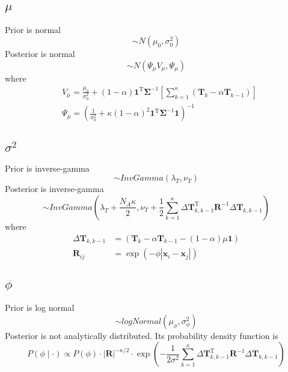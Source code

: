 \documentclass[12pt, letterpaper]{article}
\begin{document}
\subsection{$\mu$}
Prior is normal
\begin{equation}
	\sim N\left(\mu_{0}, \sigma_{0}^{2}\right)
\end{equation}
Posterior is normal
\begin{equation}
	\sim N\left(\Psi_{\mu} V_{\mu}, \Psi_{\mu}\right)
\end{equation}
where
\begin{align}
&V_{\mu}=\frac{\mu_{0}}{\sigma_{0}^{2}}+(1-\alpha) \mathbf{1}^{\mathrm{T}} \mathbf{\Sigma}^{-1}\left[\sum_{k=1}^{\kappa}\left(\mathbf{T}_{k}-\alpha \mathbf{T}_{k-1}\right)\right] \\
&\Psi_{\mu}=\left(\frac{1}{\sigma_{0}^{2}}+\kappa(1-\alpha)^{2} \mathbf{1}^{\mathrm{T}} \mathbf{\Sigma}^{-1} \mathbf{1}\right)^{-1}
\end{align}

\subsection{$\sigma^2$}
Prior is inverse-gamma
\begin{equation}
	\sim InvGamma \left(\lambda_{T}, \nu_{T}\right)
\end{equation}
Posterior is inverse-gamma
\begin{equation}
\sim InvGamma\left(\lambda_{T}+\frac{N_{A} \kappa}{2},
\nu_{T}+\frac{1}{2} \sum_{k=1}^{\kappa} \Delta \mathbf{T}_{k, k-1}^{\mathrm{T}} \mathbf{R}^{-1} \Delta \mathbf{T}_{k, k-1}\right)
\end{equation}
where
\begin{align}
\Delta \mathbf{T}_{k, k-1}&=\left(\mathbf{T}_{k}-\alpha \mathbf{T}_{k-1}-(1-\alpha) \mu \mathbf{1}\right)\\
\mathbf{R}_{i j}&=\exp \left(-\phi\left|\mathbf{x}_{i}-\mathbf{x}_{j}\right|\right)
\end{align}

\subsection{$\phi$}
Prior is log normal
\begin{equation}
	\sim logNormal\left(\mu_{\phi}, \sigma_{\phi}^{2}\right)
\end{equation}
Posterior is not analytically distributed. Its probability density function is 
\begin{equation}
P(\phi \mid \cdot) \propto P(\phi) \cdot|\mathbf{R}|^{-\kappa / 2} \cdot \exp \left(-\frac{1}{2 \sigma^{2}} \sum_{k=1}^{\kappa} \Delta \mathbf{T}_{k, k-1}^{\mathrm{T}} \mathbf{R}^{-1} \Delta \mathbf{T}_{k, k-1}\right)
\end{equation}
\end{document}
